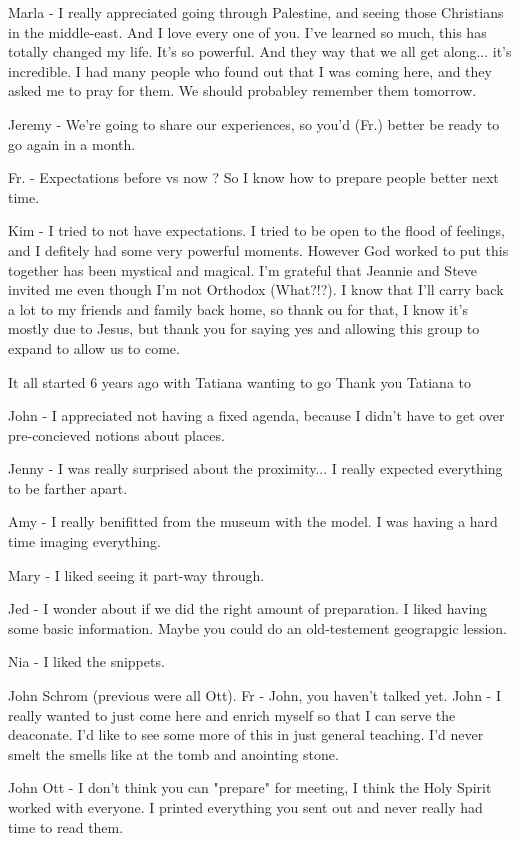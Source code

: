 \documentclass[letterpaper]{report}
\begin{document}
Marla - I really appreciated going through Palestine, and seeing those Christians in the middle-east. And I love every one of you. I've learned so much, this has totally changed my life. It's so powerful. And they way that we all get along... it's incredible. I had many people who found out that I was coming here, and  they asked me to pray for them.  We should probabley remember them tomorrow.

Jeremy - We're going to share our experiences, so you'd (Fr.) better be ready to go again in a month.

Fr. - Expectations before vs now ?  So I know how to prepare people better next time.

Kim - I tried to not have expectations.  I tried to be open to the flood of feelings, and I defitely had some very powerful moments.  However God worked to put this together has been mystical and magical.  I'm grateful that Jeannie and Steve invited me even though I'm not Orthodox (What?!?).  I know that I'll carry back a lot to my friends and family back home, so thank ou for that, I know it's mostly due to Jesus, but thank you for saying yes and allowing this group to expand to allow us to come.

It all started 6 years ago with Tatiana wanting to go
  Thank you Tatiana to 

John - I appreciated not having a fixed agenda, because I didn't have to get over pre-concieved notions about places.

Jenny - I was really surprised about the proximity... I really expected everything to be farther apart.

Amy - I really benifitted from the museum with the model.  I was having a hard time imaging everything.

Mary - I liked seeing it part-way through.

Jed - I wonder about if we did the right amount of preparation. I liked having some basic information.  Maybe you could do an old-testement geograpgic lession.

Nia - I liked the snippets.

John Schrom (previous were all Ott).
Fr - John, you haven't talked yet.
John - I really wanted to just come here and enrich myself so that I can serve the deaconate.
I'd like to see some more of this in just general teaching.
I'd never smelt the smells like at the tomb and anointing stone.

John Ott - I don't think you can "prepare" for  meeting, I think the Holy Spirit worked with everyone. I printed everything you sent out and never really had time to read them.
\end{document}
